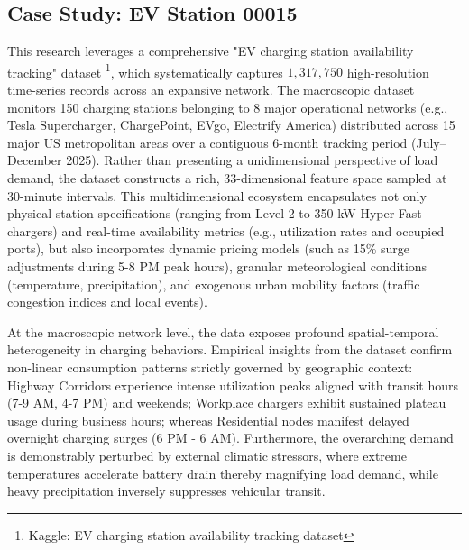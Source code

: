 \documentclass[pdflatex,sn-mathphys-num]{sn-jnl}%
\theoremstyle{thmstyleone}%
\theoremstyle{thmstyletwo}%
\theoremstyle{thmstylethree}%
\begin{document}
\subsection{Case Study: EV Station 00015}

This research leverages a comprehensive "EV charging station availability tracking" dataset \footnote{Kaggle: EV charging station availability tracking dataset}, which systematically captures $1,317,750$ high-resolution time-series records across an expansive network. The macroscopic dataset monitors 150 charging stations belonging to 8 major operational networks (e.g., Tesla Supercharger, ChargePoint, EVgo, Electrify America) distributed across 15 major US metropolitan areas over a contiguous 6-month tracking period (July–December 2025). Rather than presenting a unidimensional perspective of load demand, the dataset constructs a rich, 33-dimensional feature space sampled at 30-minute intervals. This multidimensional ecosystem encapsulates not only physical station specifications (ranging from Level 2 to 350 kW Hyper-Fast chargers) and real-time availability metrics (e.g., utilization rates and occupied ports), but also incorporates dynamic pricing models (such as 15\% surge adjustments during 5-8 PM peak hours), granular meteorological conditions (temperature, precipitation), and exogenous urban mobility factors (traffic congestion indices and local events).

At the macroscopic network level, the data exposes profound spatial-temporal heterogeneity in charging behaviors. Empirical insights from the dataset confirm non-linear consumption patterns strictly governed by geographic context: Highway Corridors experience intense utilization peaks aligned with transit hours (7-9 AM, 4-7 PM) and weekends; Workplace chargers exhibit sustained plateau usage during business hours; whereas Residential nodes manifest delayed overnight charging surges (6 PM - 6 AM). Furthermore, the overarching demand is demonstrably perturbed by external climatic stressors, where extreme temperatures accelerate battery drain thereby magnifying load demand, while heavy precipitation inversely suppresses vehicular transit.
\end{document}

